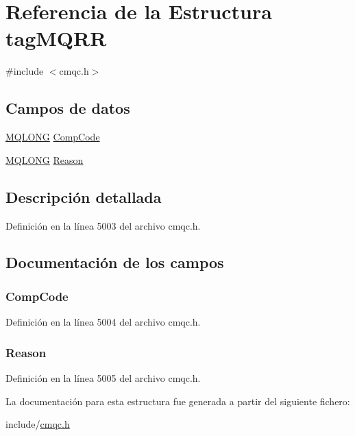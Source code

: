 \hypertarget{structtag_m_q_r_r}{}\section{Referencia de la Estructura tag\+M\+Q\+R\+R}
\label{structtag_m_q_r_r}


{\ttfamily \#include $<$cmqc.\+h$>$}

\subsection*{Campos de datos}
\begin{DoxyCompactItemize}
\item 
\hyperlink{cmqc_8h_a1fb8d28cbda3fa8766a9821230cdb6d5}{M\+Q\+L\+O\+N\+G} \hyperlink{structtag_m_q_r_r_a3d53860a50c3834d3dad9f5b2e5b5234}{Comp\+Code}
\item 
\hyperlink{cmqc_8h_a1fb8d28cbda3fa8766a9821230cdb6d5}{M\+Q\+L\+O\+N\+G} \hyperlink{structtag_m_q_r_r_ac2f0378cb0c66c5f91625822e53d7bae}{Reason}
\end{DoxyCompactItemize}


\subsection{Descripción detallada}


Definición en la línea 5003 del archivo cmqc.\+h.



\subsection{Documentación de los campos}
\hypertarget{structtag_m_q_r_r_a3d53860a50c3834d3dad9f5b2e5b5234}{}
\subsubsection[{Comp\+Code}]{ Comp\+Code}\label{structtag_m_q_r_r_a3d53860a50c3834d3dad9f5b2e5b5234}


Definición en la línea 5004 del archivo cmqc.\+h.

\hypertarget{structtag_m_q_r_r_ac2f0378cb0c66c5f91625822e53d7bae}{}
\subsubsection[{Reason}]{ Reason}\label{structtag_m_q_r_r_ac2f0378cb0c66c5f91625822e53d7bae}


Definición en la línea 5005 del archivo cmqc.\+h.



La documentación para esta estructura fue generada a partir del siguiente fichero\+:\begin{DoxyCompactItemize}
\item 
include/\hyperlink{cmqc_8h}{cmqc.\+h}\end{DoxyCompactItemize}
